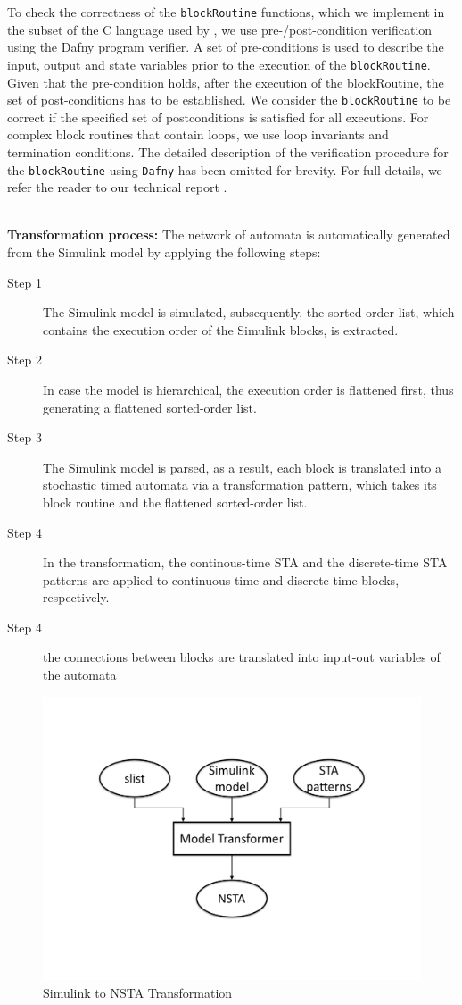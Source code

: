 To check the correctness of the \texttt{blockRoutine} functions, which we implement in the subset of the C language used by \uppaalsmc{}, we use pre-/post-condition verification using the Dafny \cite{leino2010dafny} program verifier. A set of pre-conditions is used to describe the input, output and state variables prior to the execution of the \texttt{blockRoutine}. Given that the pre-condition holds, after the execution of the blockRoutine, the set of post-conditions has to be established. We consider the \texttt{blockRoutine} to be correct if the specified set of postconditions is satisfied for all executions. For complex block routines that contain loops, we use loop invariants and termination conditions. The detailed description of the verification procedure for the \texttt{blockRoutine} using \texttt{Dafny} has been omitted for brevity. For full details, we refer the reader to our technical report \cite{filipovikj17S2UTR}. 

\noindent\\ \textbf{Transformation process:} The network of automata is automatically generated from the Simulink model by applying the following steps:
\begin{description}
	\item[Step 1] The Simulink model is simulated, subsequently, the sorted-order list, which contains the execution order of the Simulink blocks, is extracted.
	\item[Step 2] In case the model is hierarchical, the execution order is flattened first, thus generating a flattened sorted-order list.
	\item[Step 3] The Simulink model is parsed, as a result, each block is translated into a stochastic timed automata via a transformation pattern, which takes its block routine and the flattened sorted-order list.
	\item[Step 4] In the transformation, the continous-time STA and the discrete-time STA patterns are applied to continuous-time and discrete-time blocks, respectively.
	\item[Step 4] the connections between blocks are translated into input-out variables of the automata 
\end{description}

\begin{figure}
	\centering
	\includegraphics[width=0.6\linewidth]{images/simulinkapproach}
	\caption{Simulink to NSTA Transformation}
	\label{fig:approachworkflow}
\end{figure}


